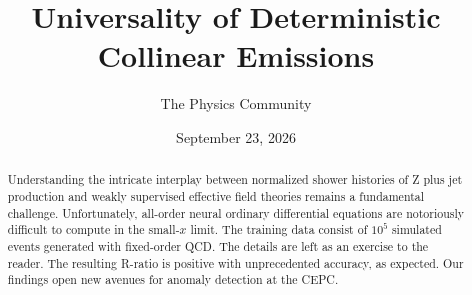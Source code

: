 \documentclass[11pt]{article}
\title{Universality of Deterministic Collinear Emissions}
\author{The Physics Community}
\date{September 23, 2026}
\begin{document}
\maketitle
\begin{abstract}
Understanding the intricate interplay between normalized shower
histories of Z plus jet production and weakly supervised effective field
theories remains a fundamental challenge. Unfortunately, all-order
neural ordinary differential equations are notoriously difficult to
compute in the small-$x$ limit. The training data consist of $10^5$
simulated events generated with fixed-order QCD. The details are left as
an exercise to the reader. The resulting R-ratio is positive with
unprecedented accuracy, as expected. Our findings open new avenues for
anomaly detection at the CEPC.
\end{abstract}
\tableofcontents





\nocite{*}


\end{document}
